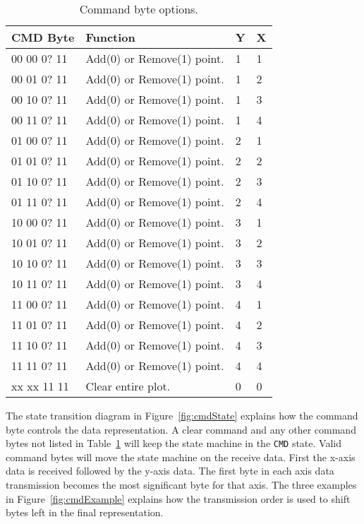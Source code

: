 \begin{table}[h]
   \centering
    \begin{tabular}{ | p{3cm} | p{6cm}|p{0.6cm} | p{0.6cm}|}\hline
    \textbf{CMD Byte} 	& \textbf{Function} 						& \textbf{Y}	& \textbf{X}\\ \hline
	00 00 0? 11 			&	Add(0) or Remove(1) point. 				& 1				& 1 						\\ \hline
	00 01 0? 11 			&	Add(0) or Remove(1) point. 				& 1				& 2 						\\ \hline
	00 10 0? 11 			&	Add(0) or Remove(1) point. 				& 1				& 3 						\\ \hline
	00 11 0? 11 			&	Add(0) or Remove(1) point. 				& 1				& 4 						\\ \hline
	01 00 0? 11 			&	Add(0) or Remove(1) point. 				& 2				& 1 						\\ \hline
	01 01 0? 11 			&	Add(0) or Remove(1) point. 				& 2				& 2 						\\ \hline
	01 10 0? 11 			&	Add(0) or Remove(1) point. 				& 2				& 3 						\\ \hline
	01 11 0? 11 			&	Add(0) or Remove(1) point. 				& 2				& 4 						\\ \hline
	10 00 0? 11 			&	Add(0) or Remove(1) point. 				& 3				& 1 						\\ \hline
	10 01 0? 11 			&	Add(0) or Remove(1) point. 				& 3				& 2 						\\ \hline
	10 10 0? 11 			&	Add(0) or Remove(1) point. 				& 3				& 3 						\\ \hline
	10 11 0? 11 			&	Add(0) or Remove(1) point. 				& 3				& 4 						\\ \hline
	11 00 0? 11 			&	Add(0) or Remove(1) point. 				& 4				& 1 						\\ \hline
	11 01 0? 11 			&	Add(0) or Remove(1) point. 				& 4				& 2 						\\ \hline
	11 10 0? 11 			&	Add(0) or Remove(1) point. 				& 4				& 3 						\\ \hline
	11 11 0? 11 			&	Add(0) or Remove(1) point. 				& 4				& 4 						\\ \hline
	xx xx 11 11 			&	Clear entire plot.			 			& 0				& 0 						\\ \hline
    \end{tabular}
    \caption{Command byte options.}
    \label{tab:cmdByte}
\end{table}

The state transition diagram in Figure~\ref{fig:cmdState} explains how the command byte controls the data representation.
A clear command and any other command bytes not listed in Table~\ref{tab:cmdByte} will keep the state machine in the \texttt{CMD} state.
Valid command bytes will move the state machine on the receive data.
First the x-axis data is received followed by the y-axis data.
The first byte in each axis data transmission becomes the most significant byte for that axis.
The three examples in Figure~\ref{fig:cmdExample} explains how the transmission order is used to shift bytes left in the final representation.


